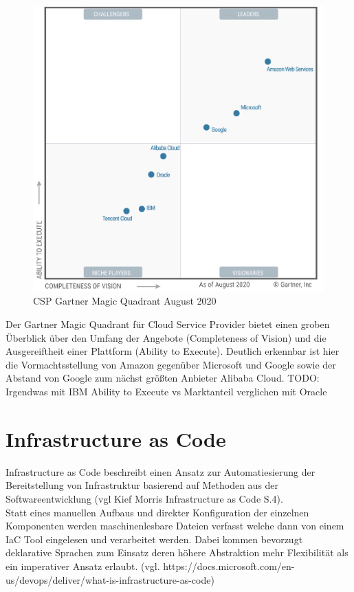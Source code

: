 \begin{spacing}{1.2}
\begin{figure}[H]
  \includegraphics[width=1.0\textwidth]{fig/hauptteil/Gartner-Magic-Quadrant.png}
  \caption{CSP Gartner Magic Quadrant August 2020}
  \centering
\end{figure}

Der Gartner Magic Quadrant für Cloud Service Provider bietet einen groben
Überblick über den Umfang der Angebote (Completeness of Vision) und
die Ausgereiftheit einer Plattform (Ability to Execute). Deutlich erkennbar
ist hier die Vormachtsstellung von Amazon gegenüber Microsoft und Google sowie
der Abstand von Google zum nächst größten Anbieter Alibaba Cloud.
TODO: Irgendwas mit IBM Ability to Execute vs Marktanteil verglichen mit Oracle


\section{Infrastructure as Code}

Infrastructure as Code beschreibt einen Ansatz zur Automatiesierung der
Bereitstellung von Infrastruktur basierend auf Methoden aus der
Softwareentwicklung (vgl Kief Morris Infrastructure as Code S.4).\\
Statt eines manuellen Aufbaus und direkter Konfiguration der einzelnen
Komponenten werden maschinenlesbare Dateien verfasst welche dann von einem
IaC Tool eingelesen und verarbeitet werden. Dabei kommen bevorzugt
deklarative Sprachen zum Einsatz deren höhere Abstraktion mehr Flexibilität
als ein imperativer Ansatz erlaubt.
(vgl. https://docs.microsoft.com/en-us/devops/deliver/what-is-infrastructure-as-code)


\end{spacing}
